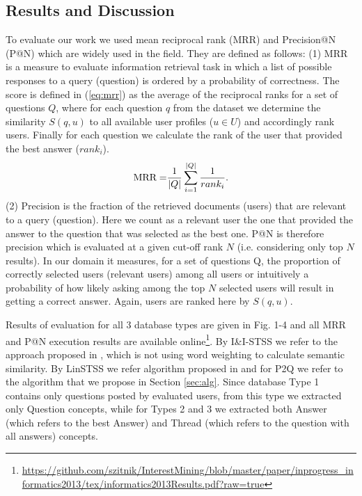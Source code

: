 \documentclass[conference]{IEEEtran}
\begin{document}
\subsection{Results and Discussion}
To evaluate our work we used mean reciprocal rank (MRR) and Precision@N (P@N) which are widely used in the field. They are defined as follows: (1) MRR is a measure to evaluate information retrieval task in which a list of possible responses to a query (question) is ordered by a probability of correctness. The score is defined in (\ref{eq:mrr}) as the average of the reciprocal ranks for a set of questions $Q$, where for each question $q$ from the dataset we determine the similarity $S(q,u)$ to all available user profiles ($u \in U$) and accordingly rank users. Finally for each question we calculate the rank of the user that provided the best answer ($rank_i$).
\begin{equation}
	\label{eq:mrr}
	{\rm MRR = }\frac{1}{|Q|}\sum_{i=1}^{|Q|}\frac{1}{rank_i}.
\end{equation}
(2) Precision is the fraction of the retrieved documents (users) that are relevant to a query (question). Here we count as a relevant user the one that provided the answer to the question that was selected as the best one. P@N is therefore precision which is evaluated at a given cut-off rank $N$ (i.e. considering only top $N$ results). In our domain it measures, for a set of questions Q, the proportion of correctly selected users (relevant users) among all users or intuitively a probability of how likely asking among the top $N$ selected users will result in getting a correct answer. Again, users are ranked here by $S(q,u)$.

Results of evaluation for all 3 database types are given in Fig. 1-4 and all MRR and P@N execution results are available online\footnote{\url{https://github.com/szitnik/InterestMining/blob/master/paper/inprogress_informatics2013/tex/informatics2013Results.pdf?raw=true}}. By I\&I-STSS we refer to the approach proposed in \cite{bib:1}, which is not using word weighting to calculate semantic similarity. By LinSTSS we refer algorithm proposed in \cite{bib:LinSTSS} and for P2Q we refer to the algorithm that we propose in Section \ref{sec:alg}.  
Since database Type 1 contains only questions posted by evaluated users, from this type we extracted only Question concepts, while for Types 2 and 3 we extracted both Answer (which refers to the best Answer) and Thread (which refers to the question with all answers) concepts.
\end{document}
